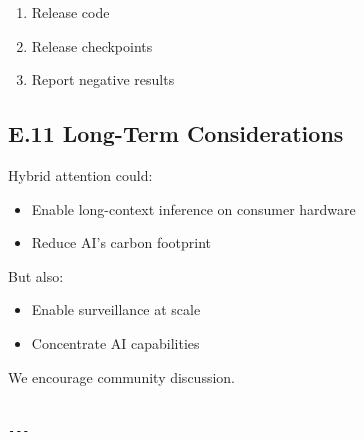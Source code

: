 \begin{enumerate}
\item Release code
\item Release checkpoints
\item Report negative results

\end{enumerate}
\subsection{E.11 Long-Term Considerations}

Hybrid attention could:

\begin{itemize}
\item Enable long-context inference on consumer hardware
\item Reduce AI's carbon footprint

\end{itemize}
But also:

\begin{itemize}
\item Enable surveillance at scale
\item Concentrate AI capabilities

\end{itemize}
We encourage community discussion.
\begin{lstlisting}

---
\end{lstlisting}